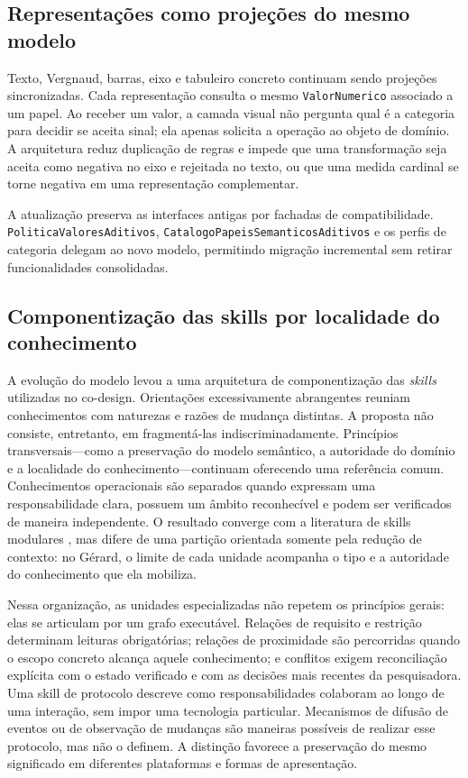 \documentclass[preprint,12pt,authoryear]{elsarticle}
\newcommand{\gerard}{Gérard\xspace}
\begin{document}
\subsection{Representações como projeções do mesmo modelo}

Texto, Vergnaud, barras, eixo e tabuleiro concreto continuam sendo projeções sincronizadas. Cada representação consulta o mesmo \texttt{ValorNumerico} associado a um papel. Ao receber um valor, a camada visual não pergunta qual é a categoria para decidir se aceita sinal; ela apenas solicita a operação ao objeto de domínio. A arquitetura reduz duplicação de regras e impede que uma transformação seja aceita como negativa no eixo e rejeitada no texto, ou que uma medida cardinal se torne negativa em uma representação complementar.

A atualização preserva as interfaces antigas por fachadas de compatibilidade. \texttt{PoliticaValoresAditivos}, \texttt{CatalogoPapeisSemanticosAditivos} e os perfis de categoria delegam ao novo modelo, permitindo migração incremental sem retirar funcionalidades consolidadas.

\subsection{Componentização das skills por localidade do conhecimento}

A evolução do modelo levou a uma arquitetura de componentização das \emph{skills} utilizadas no co-design. Orientações excessivamente abrangentes reuniam conhecimentos com naturezas e razões de mudança distintas. A proposta não consiste, entretanto, em fragmentá-las indiscriminadamente. Princípios transversais---como a preservação do modelo semântico, a autoridade do domínio e a localidade do conhecimento---continuam oferecendo uma referência comum. Conhecimentos operacionais são separados quando expressam uma responsabilidade clara, possuem um âmbito reconhecível e podem ser verificados de maneira independente. O resultado converge com a literatura de skills modulares \citep{badhe2026survey,zare2026microskill}, mas difere de uma partição orientada somente pela redução de contexto: no \gerard, o limite de cada unidade acompanha o tipo e a autoridade do conhecimento que ela mobiliza.

Nessa organização, as unidades especializadas não repetem os princípios gerais: elas se articulam por um grafo executável. Relações de requisito e restrição determinam leituras obrigatórias; relações de proximidade são percorridas quando o escopo concreto alcança aquele conhecimento; e conflitos exigem reconciliação explícita com o estado verificado e com as decisões mais recentes da pesquisadora. Uma skill de protocolo descreve como responsabilidades colaboram ao longo de uma interação, sem impor uma tecnologia particular. Mecanismos de difusão de eventos ou de observação de mudanças são maneiras possíveis de realizar esse protocolo, mas não o definem. A distinção favorece a preservação do mesmo significado em diferentes plataformas e formas de apresentação.
\end{document}
